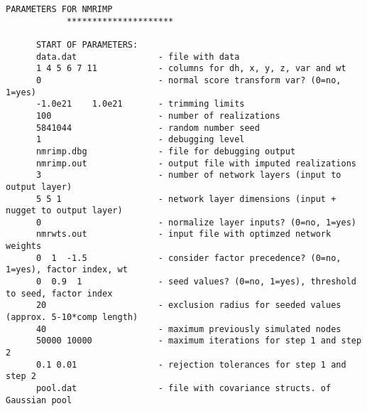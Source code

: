 \begin{framed}
   \begin{lstlisting}[style=ccgParameterfile]
            PARAMETERS FOR NMRIMP
            *********************

      START OF PARAMETERS:
      data.dat                - file with data
      1 4 5 6 7 11            - columns for dh, x, y, z, var and wt
      0                       - normal score transform var? (0=no, 1=yes)
      -1.0e21    1.0e21       - trimming limits
      100                     - number of realizations
      5841044                 - random number seed
      1                       - debugging level
      nmrimp.dbg              - file for debugging output
      nmrimp.out              - output file with imputed realizations
      3                       - number of network layers (input to output layer)
      5 5 1                   - network layer dimensions (input + nugget to output layer)
      0                       - normalize layer inputs? (0=no, 1=yes)
      nmrwts.out              - input file with optimzed network weights
      0  1  -1.5              - consider factor precedence? (0=no, 1=yes), factor index, wt
      0  0.9  1               - seed values? (0=no, 1=yes), threshold to seed, factor index
      20                      - exclusion radius for seeded values (approx. 5-10*comp length)
      40                      - maximum previously simulated nodes
      50000 10000             - maximum iterations for step 1 and step 2
      0.1 0.01                - rejection tolerances for step 1 and step 2
      pool.dat                - file with covariance structs. of Gaussian pool
    \end{lstlisting}
\end{framed}

